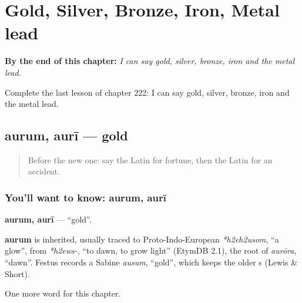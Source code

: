 
\chapter{Gold, Silver, Bronze, Iron, Metal lead}
\label{ch:la-gold-silver-bronze-iron-metal-lead}

\begin{chapteropening}
\textbf{By the end of this chapter:} \emph{I can say gold, silver, bronze, iron and the metal lead.}

Complete the last lesson of chapter 222: I can say gold, silver, bronze, iron and the metal lead.
\end{chapteropening}

\section[aurum, aurī]{aurum, aurī — gold}

\label{lesson:LA-C222-aurum}



\begin{quote}
Before the new one: say the Latin for fortune, then the Latin for an accident.
\end{quote}

\subsection*{You'll want to know: aurum, aurī}
\textbf{aurum, aurī} — \textquotedblleft{}gold\textquotedblright{}.

\begin{cousinweb}
\textbf{aurum} is inherited, usually traced to Proto-Indo-European \emph{*h2eh2usom}, \textquotedblleft{}a glow\textquotedblright{}, from \emph{*h2ews-}, \textquotedblleft{}to dawn, to grow light\textquotedblright{} (EtymDB 2.1), the root of \emph{aurōra}, \textquotedblleft{}dawn\textquotedblright{}. Festus records a Sabine \emph{ausum}, \textquotedblleft{}gold\textquotedblright{}, which keeps the older s (Lewis \& Short).
\end{cousinweb}

\begin{grammarlens}[title={What you've built}]
One more word for this chapter.
\end{grammarlens}

